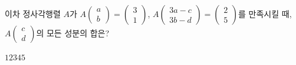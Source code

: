 \hspace*{2mm}\begin{minipage}[t]{\dimexpr\linewidth-2mm\relax}\vspace{0pt}
이차 정사각행렬 $A$가 $A\begin{pmatrix} a \\ b \end{pmatrix}=\begin{pmatrix} 3 \\ 1 \end{pmatrix}$, $A\begin{pmatrix} 3a-c \\ 3b-d \end{pmatrix}=\begin{pmatrix} 2 \\ 5 \end{pmatrix}$를 만족시킬 때, $A\begin{pmatrix} c \\ d \end{pmatrix}$의 모든 성분의 합은? 
\begin{choices32}{$1$}{$2$}{$3$}{$4$}{$5$}\end{choices32}\end{minipage}
